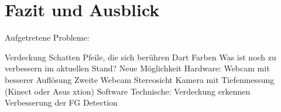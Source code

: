
\chapter{Fazit und Ausblick}
\label{chap:prospect}
Aufgetretene Probleme:

Verdeckung
Schatten
Pfeile, die sich berühren
Dart Farben
Was ist noch zu verbessern im aktuellen Stand?
Neue Möglichkeit Hardware:
Webcam mit besserer Auflösung
Zweite Webcam Stereosicht
Kamera mit Tiefenmessung (Kinect oder Asus xtion) 
Software Technische:
Verdeckung erkennen
Verbesserung der FG Detection

